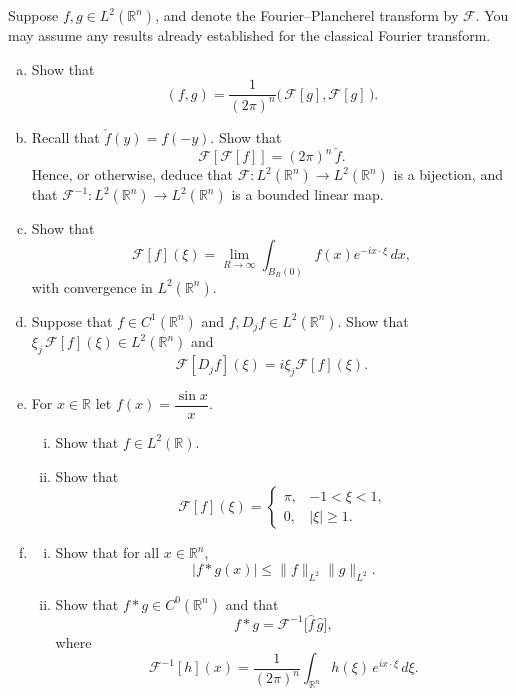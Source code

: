 \documentclass[12pt,a4paper]{article}
\theoremstyle{plain}
\theoremstyle{definition}
\theoremstyle{remark}
\theoremstyle{remark}
\begin{document}
Suppose $f,g\in L^{2}(\mathbb{R}^{n})$, and denote the Fourier--Plancherel
transform by $\mathcal{F}$.  You may assume any results already established
for the classical Fourier transform.

\begin{enumerate}[(a)]
	
	\item Show that
	\[
	(f,g)
	= \frac{1}{(2\pi)^{n}}
	\bigl(\,\mathcal{F}[g],\mathcal{F}[g]\,\bigr).
	\]
	
	\item Recall that $\check{f}(y)=f(-y)$.  Show that
	\[
	\mathcal{F}[\mathcal{F}[f]] = (2\pi)^{n}\,\check{f}.
	\]
	Hence, or otherwise, deduce that
	$\mathcal{F}:L^{2}(\mathbb{R}^{n})\to L^{2}(\mathbb{R}^{n})$ is a bijection,
	and that
	$\mathcal{F}^{-1}:L^{2}(\mathbb{R}^{n})\to L^{2}(\mathbb{R}^{n})$ is a
	bounded linear map.
	
	\item Show that
	\[
	\mathcal{F}[f](\xi)
	= \lim_{R\to\infty} \int_{B_{R}(0)} f(x)e^{-ix\cdot\xi}\,dx,
	\]
	with convergence in $L^{2}(\mathbb{R}^{n})$.
	
	\item Suppose that $f\in C^{1}(\mathbb{R}^{n})$ and
	$f, D_{j}f\in L^{2}(\mathbb{R}^{n})$.  Show that
	$\xi_{j}\,\mathcal{F}[f](\xi)\in L^{2}(\mathbb{R}^{n})$ and
	\[
	\mathcal{F}[D_{j}f](\xi)
	= i\xi_{j}\mathcal{F}[f](\xi).
	\]
	
	\item For $x\in\mathbb{R}$ let $f(x)=\dfrac{\sin x}{x}$.
	\begin{enumerate}[i.]
		\item Show that $f\in L^{2}(\mathbb{R})$.
		\item Show that
		\[
		\mathcal{F}[f](\xi)
		=
		\begin{cases}
			\pi, & -1<\xi<1,\\[0.3em]
			0,   & |\xi|\ge 1.
		\end{cases}
		\]
	\end{enumerate}
	
	\item
	\begin{enumerate}[i.]
		\item Show that for all $x\in\mathbb{R}^{n}$,
		\[
		|f*g(x)| \le \|f\|_{L^{2}}\|g\|_{L^{2}}.
		\]
		
		\item Show that $f*g\in C^{0}(\mathbb{R}^{n})$ and that
		\[
		f*g = \mathcal{F}^{-1}\bigl[\widehat{f}\,\widehat{g}\bigr],
		\]
		where
		\[
		\mathcal{F}^{-1}[h](x)
		= \frac{1}{(2\pi)^{n}} \int_{\mathbb{R}^{n}} h(\xi)\,e^{ix\cdot\xi}\,d\xi.
		\]
	\end{enumerate}
	
\end{enumerate}
\end{document}
